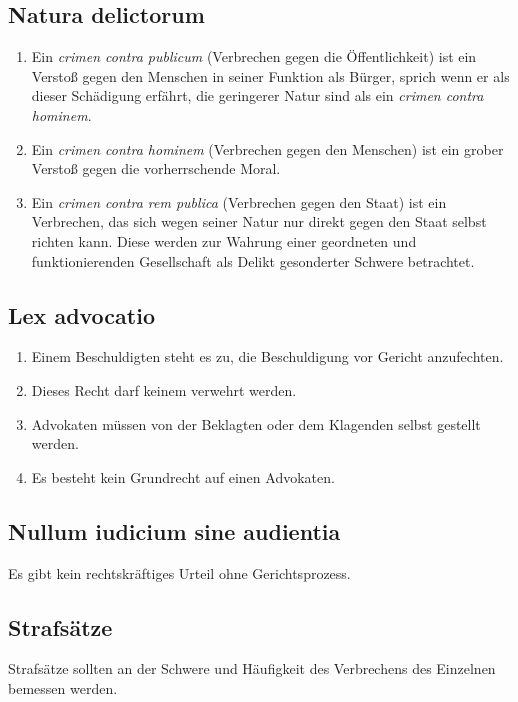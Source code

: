 \documentclass{article}
\begin{document}
\subsection{Natura delictorum}
\begin{enumerate}[(1)]
    \item Ein \textit{crimen contra publicum} (Verbrechen gegen die Öffentlichkeit) ist ein Verstoß gegen den Menschen in seiner Funktion als Bürger, sprich wenn er als dieser Schädigung erfährt, die geringerer Natur sind als ein \textit{crimen contra hominem}.
    \item Ein \textit{crimen contra hominem} (Verbrechen gegen den Menschen) ist ein grober Verstoß gegen die vorherrschende Moral.
    \item Ein \textit{crimen contra rem publica} (Verbrechen gegen den Staat) ist ein Verbrechen, das sich wegen seiner Natur nur direkt gegen den Staat selbst richten kann. Diese werden zur Wahrung einer geordneten und funktionierenden Gesellschaft als Delikt gesonderter Schwere betrachtet.
\end{enumerate}

\subsection{Lex advocatio}
\begin{enumerate}[(1)]
    \item Einem Beschuldigten steht es zu, die Beschuldigung vor Gericht anzufechten.
    \item Dieses Recht darf keinem verwehrt werden.
    \item Advokaten müssen von der Beklagten oder dem Klagenden selbst gestellt werden.
    \item Es besteht kein Grundrecht auf einen Advokaten.
\end{enumerate}

\subsection{Nullum iudicium sine audientia}
Es gibt kein rechtskräftiges Urteil ohne Gerichtsprozess.

\subsection{Strafsätze}
Strafsätze sollten an der Schwere und Häufigkeit des Verbrechens des Einzelnen bemessen werden.
\end{document}
